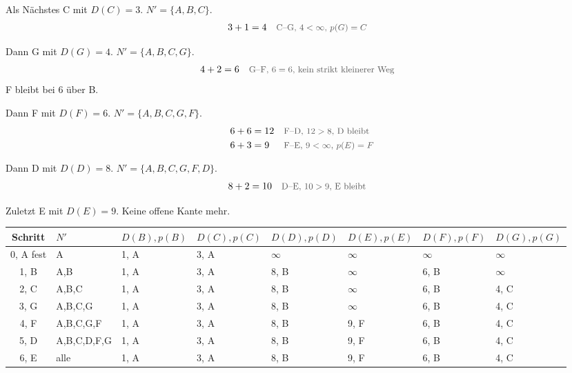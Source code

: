 \documentclass[a4paper,11pt]{article}
\newcommand{\why}[1]{\text{\small\color{black!65}#1}}
\begin{document}
Als Nächstes C mit \(D(C)=3\). \(N'=\{A,B,C\}\).
\begin{align*}
3+1 &= 4 && \why{C--G, $4<\infty$, $p(G)=C$}
\end{align*}

Dann G mit \(D(G)=4\). \(N'=\{A,B,C,G\}\).
\begin{align*}
4+2 &= 6 && \why{G--F, $6=6$, kein strikt kleinerer Weg}
\end{align*}
F bleibt bei 6 über B.

Dann F mit \(D(F)=6\). \(N'=\{A,B,C,G,F\}\).
\begin{align*}
6+6 &= 12 && \why{F--D, $12>8$, D bleibt}\\
6+3 &= 9 && \why{F--E, $9<\infty$, $p(E)=F$}
\end{align*}

Dann D mit \(D(D)=8\). \(N'=\{A,B,C,G,F,D\}\).
\begin{align*}
8+2 &= 10 && \why{D--E, $10>9$, E bleibt}
\end{align*}

Zuletzt E mit \(D(E)=9\). Keine offene Kante mehr.

\begin{center}
\scriptsize
\begin{tabular}{@{}clllllll@{}}
\toprule
Schritt & \(N'\) & \(D(B),p(B)\) & \(D(C),p(C)\) & \(D(D),p(D)\) & \(D(E),p(E)\) & \(D(F),p(F)\) & \(D(G),p(G)\) \\
\midrule
0, A fest & A & 1, A & 3, A & \(\infty\) & \(\infty\) & \(\infty\) & \(\infty\) \\
1, B & A,B & 1, A & 3, A & 8, B & \(\infty\) & 6, B & \(\infty\) \\
2, C & A,B,C & 1, A & 3, A & 8, B & \(\infty\) & 6, B & 4, C \\
3, G & A,B,C,G & 1, A & 3, A & 8, B & \(\infty\) & 6, B & 4, C \\
4, F & A,B,C,G,F & 1, A & 3, A & 8, B & 9, F & 6, B & 4, C \\
5, D & A,B,C,D,F,G & 1, A & 3, A & 8, B & 9, F & 6, B & 4, C \\
6, E & alle & 1, A & 3, A & 8, B & 9, F & 6, B & 4, C \\
\bottomrule
\end{tabular}
\end{center}
\end{document}
